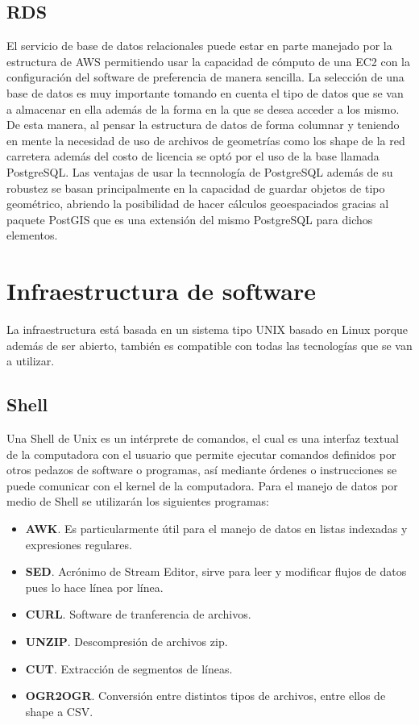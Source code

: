 \subsection{RDS}
El servicio de base de datos relacionales puede estar en parte manejado por la estructura de AWS permitiendo usar la capacidad de cómputo de una EC2 con la configuración del software de preferencia de manera sencilla. La selección de una base de datos es muy importante tomando en cuenta el tipo de datos que se van a almacenar en ella además de la forma en la que se desea acceder a los mismo. De esta manera, al pensar la estructura de datos de forma columnar y teniendo en mente la necesidad de uso de archivos de geometrías como los shape de la red carretera además del costo de licencia se optó por el uso de la base llamada PostgreSQL. Las ventajas de usar la tecnnología de PostgreSQL además de su robustez se basan principalmente en la capacidad de guardar objetos de tipo geométrico, abriendo la posibilidad de hacer cálculos geoespaciados gracias al paquete PostGIS que es una extensión del mismo PostgreSQL para dichos elementos.

\section{Infraestructura de software}
La infraestructura está basada en un sistema tipo UNIX basado en Linux porque además de ser abierto, también es compatible con todas las tecnologías que se van a utilizar.\\
\subsection{Shell}
Una Shell de Unix es un intérprete de comandos, el cual es una interfaz textual de la computadora con el usuario que permite ejecutar comandos definidos por otros pedazos de software o programas, así mediante órdenes o instrucciones se puede comunicar con el kernel de la computadora. Para el manejo de datos por medio de Shell se utilizarán los siguientes programas:
\begin{itemize}
    \item \textbf{AWK}. Es particularmente útil para el manejo de datos en listas indexadas y expresiones regulares.
    \item \textbf{SED}. Acrónimo de Stream Editor, sirve para leer y modificar flujos de datos pues lo hace línea por línea.
    \item \textbf{CURL}. Software de tranferencia de archivos.
    \item \textbf{UNZIP}. Descompresión de archivos zip.
    \item \textbf{CUT}. Extracción de segmentos de líneas.
    \item \textbf{OGR2OGR}. Conversión entre distintos tipos de archivos, entre ellos de shape a CSV.
\end{itemize}
